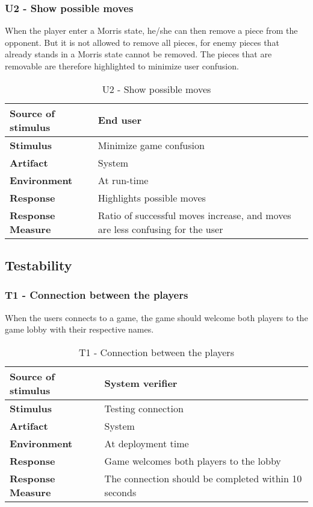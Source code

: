 \subsubsection{U2 - Show possible moves}

When the player enter a Morris state, he/she can then remove a piece from the opponent. But it is not allowed to remove all pieces, for enemy pieces that already stands in a Morris state cannot be removed. The pieces that are removable are therefore highlighted to minimize user confusion.

\begin{table}[h!]
\begin{tabular}{ | p{110pt} | p{250pt}  |}
\hline
\bf Source of stimulus &  End user  \\ \hline
\bf Stimulus & Minimize game confusion \\ \hline 
\bf Artifact & System  \\  \hline
\bf Environment & At run-time \\ \hline
\bf Response & Highlights possible moves \\ \hline
\bf Response Measure & Ratio of successful moves increase, and moves are less confusing for the user \\ \hline

\end{tabular}
\caption{U2 - Show possible moves}
\end{table}

\subsection{Testability}

\subsubsection{T1 - Connection between the players}
When the users connects to a game, the game should welcome both players to the game lobby with their respective names.

\begin{table}[h!]
\begin{tabular}{ | p{110pt} | p{250pt}  |}
\hline
\bf Source of stimulus & System verifier  \\ \hline
\bf Stimulus & Testing connection \\ \hline 
\bf Artifact & System  \\  \hline
\bf Environment & At deployment time \\ \hline
\bf Response & Game welcomes both players to the lobby \\ \hline
\bf Response Measure & The connection should be completed within 10 seconds \\ \hline

\end{tabular}
\caption{T1 - Connection between the players}
\end{table}

\pagebreak



